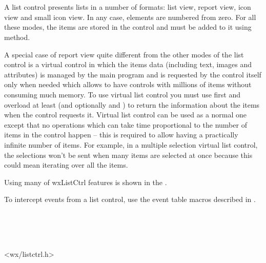 \section{}\label{wxlistctrl}

A list control presents lists in a number of formats: list view, report view,
icon view and small icon view. In any case, elements are numbered from zero.
For all these modes, the items are stored in the control and must be added to
it using  method.

A special case of report view quite different from the other modes of the list
control is a virtual control in which the items data (including text, images
and attributes) is managed by the main program and is requested by the control
itself only when needed which allows to have controls with millions of items
without consuming much memory. To use virtual list control you must use 
 first and overload at least 
 (and optionally 
 and 
) to return the information
about the items when the control requests it. Virtual list control can be used
as a normal one except that no operations which can take time proportional to
the number of items in the control happen -- this is required to allow having a
practically infinite number of items. For example, in a multiple selection
virtual list control, the selections won't be sent when many items are selected
at once because this could mean iterating over all the items.

Using many of wxListCtrl features is shown in the
.

To intercept events from a list control, use the event table macros described
in .


\\
\\
\\


<wx/listctrl.h>


